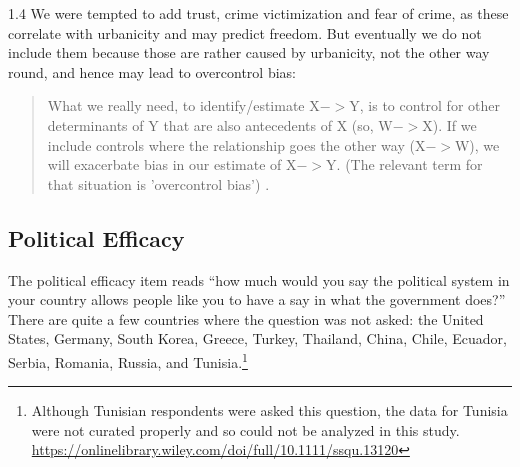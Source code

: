 \documentclass[10pt, letterpaper]{article}
\begin{document}
\begin{spacing}{1.4}
We were tempted to add trust, crime victimization and fear of crime, as these
correlate with urbanicity and may predict freedom. 
But eventually we do not include them because those are rather caused by urbanicity, not the
other way round, and hence may lead to overcontrol bias:
\begin{quote}
What we really need, to identify/estimate X$->$Y, is to control for other
determinants of Y that are also antecedents of X (so, W$->$X). If we include
controls where the relationship goes the other way (X$->$W), we will exacerbate
bias in our estimate of X$->$Y. (The relevant term for that situation is
'overcontrol bias') \citep[][p. 5]{bartram24}.
\end{quote}


\subsection{Political Efficacy}

 The  political efficacy item reads ``how much would you
 say the political system in your country allows people like you to have a say
 in what the government does?''
 There are quite a few countries where the question was not asked:
 the United States, Germany, South Korea, Greece,
 Turkey, Thailand, China, Chile, Ecuador, Serbia, Romania, Russia, and
 Tunisia.\footnote{Although
 Tunisian respondents were asked this question, the data for Tunisia were not
 curated properly and so could not be analyzed in this
 study. \url{https://onlinelibrary.wiley.com/doi/full/10.1111/ssqu.13120}} 
 

\end{spacing}
\end{document}
